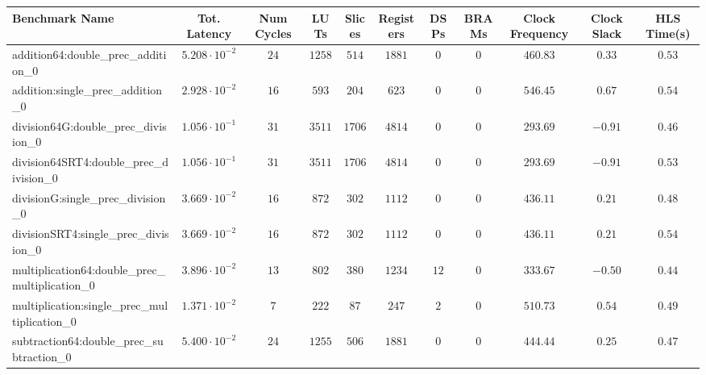 \begin{tabular}{|l|c|c|c|c|c|c|c|c|c|c|}
\hline
Benchmark Name                                   & Tot. Latency            & Num Cycles & LUTs      & Slices   & Registers & DSPs   & BRAMs & Clock Frequency & Clock Slack & HLS Time(s) \\
\hline
addition64:double\_prec\_addition\_0             & $ 5.208 \cdot 10^{-2} $ & $ 24     $ & $ 1258  $ & $ 514  $ & $ 1881  $ & $ 0  $ & $ 0 $ & $ 460.83      $ & $ 0.33    $ & $ 0.53    $ \\
addition:single\_prec\_addition\_0               & $ 2.928 \cdot 10^{-2} $ & $ 16     $ & $ 593   $ & $ 204  $ & $ 623   $ & $ 0  $ & $ 0 $ & $ 546.45      $ & $ 0.67    $ & $ 0.54    $ \\
division64G:double\_prec\_division\_0            & $ 1.056 \cdot 10^{-1} $ & $ 31     $ & $ 3511  $ & $ 1706 $ & $ 4814  $ & $ 0  $ & $ 0 $ & $ 293.69      $ & $ -0.91   $ & $ 0.46    $ \\
division64SRT4:double\_prec\_division\_0         & $ 1.056 \cdot 10^{-1} $ & $ 31     $ & $ 3511  $ & $ 1706 $ & $ 4814  $ & $ 0  $ & $ 0 $ & $ 293.69      $ & $ -0.91   $ & $ 0.53    $ \\
divisionG:single\_prec\_division\_0              & $ 3.669 \cdot 10^{-2} $ & $ 16     $ & $ 872   $ & $ 302  $ & $ 1112  $ & $ 0  $ & $ 0 $ & $ 436.11      $ & $ 0.21    $ & $ 0.48    $ \\
divisionSRT4:single\_prec\_division\_0           & $ 3.669 \cdot 10^{-2} $ & $ 16     $ & $ 872   $ & $ 302  $ & $ 1112  $ & $ 0  $ & $ 0 $ & $ 436.11      $ & $ 0.21    $ & $ 0.54    $ \\
multiplication64:double\_prec\_multiplication\_0 & $ 3.896 \cdot 10^{-2} $ & $ 13     $ & $ 802   $ & $ 380  $ & $ 1234  $ & $ 12 $ & $ 0 $ & $ 333.67      $ & $ -0.50   $ & $ 0.44    $ \\
multiplication:single\_prec\_multiplication\_0   & $ 1.371 \cdot 10^{-2} $ & $ 7      $ & $ 222   $ & $ 87   $ & $ 247   $ & $ 2  $ & $ 0 $ & $ 510.73      $ & $ 0.54    $ & $ 0.49    $ \\
subtraction64:double\_prec\_subtraction\_0       & $ 5.400 \cdot 10^{-2} $ & $ 24     $ & $ 1255  $ & $ 506  $ & $ 1881  $ & $ 0  $ & $ 0 $ & $ 444.44      $ & $ 0.25    $ & $ 0.47    $ \\

\end{tabular}
